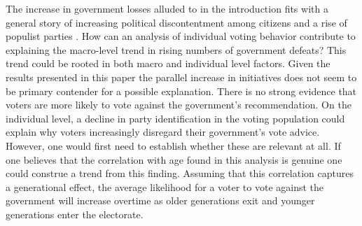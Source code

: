 \documentclass[11pt,a4paper]{article}\usepackage[]{graphicx}\usepackage[]{color}
\begin{document}
   The increase in government losses alluded to in the introduction fits with a general story of increasing political discontentment among citizens and a rise of populist parties  \citep[e.g.][]{mair_ruling_2013}. How can an analysis of individual voting behavior contribute to explaining the macro-level trend in rising numbers of government defeats? 
   This trend could be rooted in both macro and individual level factors. Given the results presented in this paper the parallel increase in initiatives does not seem to be primary contender for a possible explanation. There is no strong evidence that voters are more likely to vote against the government's recommendation. On the individual level, a decline in party identification in the voting population could explain why voters increasingly disregard their government's vote advice. However, one would first need to establish whether these are relevant at all. If one believes that the correlation with age found in this analysis is genuine one could construe a trend from this finding. Assuming that this correlation captures a generational effect, the average likelihood for a voter to vote against the government will increase overtime as older generations exit and younger generations enter the electorate. 
    
    
    \small\printbibliography
\end{document}
